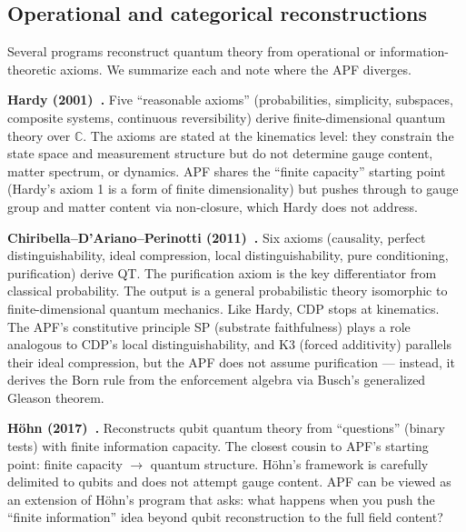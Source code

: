 \documentclass[11pt,a4paper]{article}
\theoremstyle{definition}
\begin{document}

\subsection{Operational and categorical reconstructions}
\label{sec:op_reconstructions}

Several programs reconstruct quantum theory from operational or
information-theoretic axioms.  We summarize each and note where the
APF diverges.

\smallskip\noindent\textbf{Hardy (2001)~\cite{Hardy2001}.}\quad
Five ``reasonable axioms'' (probabilities, simplicity, subspaces,
composite systems, continuous reversibility) derive finite-dimensional
quantum theory over $\mathbb{C}$.  The axioms are stated at the
kinematics level: they constrain the state space and measurement
structure but do not determine gauge content, matter spectrum, or
dynamics.  APF shares the ``finite capacity'' starting point
(Hardy's axiom 1 is a form of finite dimensionality) but pushes
through to gauge group and matter content via non-closure, which
Hardy does not address.

\smallskip\noindent\textbf{Chiribella--D'Ariano--Perinotti
(2011)~\cite{CDP2011}.}\quad
Six axioms (causality, perfect distinguishability, ideal compression,
local distinguishability, pure conditioning, purification) derive QT.
The purification axiom is the key differentiator from classical
probability.  The output is a general probabilistic theory isomorphic
to finite-dimensional quantum mechanics.  Like Hardy, CDP stops at
kinematics.  The APF's constitutive principle SP (substrate faithfulness)
plays a role analogous to CDP's local distinguishability, and K3
(forced additivity) parallels their ideal compression, but the APF
does not assume purification --- instead, it derives the Born rule
from the enforcement algebra via Busch's generalized Gleason theorem.

\smallskip\noindent\textbf{H\"ohn (2017)~\cite{Hohn2017}.}\quad
Reconstructs qubit quantum theory from ``questions'' (binary tests)
with finite information capacity.  The closest cousin to APF's
starting point: finite capacity $\to$ quantum structure.  H\"ohn's
framework is carefully delimited to qubits and does not attempt gauge
content.  APF can be viewed as an extension of H\"ohn's program that
asks: what happens when you push the ``finite information'' idea beyond
qubit reconstruction to the full field content?
\end{document}
